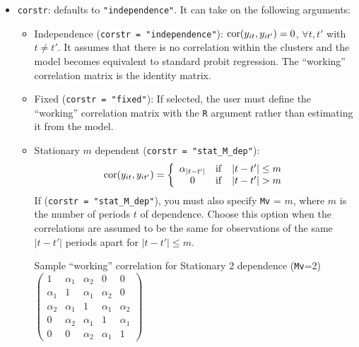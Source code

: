 \begin{itemize}
\item \texttt{corstr}: defaults to {\tt "independence"}.  It can take on the following arguments:
\begin{itemize}
\item Independence (\texttt{corstr = "independence"}): ${\rm
    cor}(y_{it}, y_{it'})=0$, $\forall t, t'$ with $t\ne t'$.  It assumes that there is no correlation within the clusters and the model becomes equivalent to standard probit regression.  The ``working'' correlation matrix is the identity matrix.
\item Fixed (\texttt{corstr = "fixed"}): If selected, the user must define the ``working'' correlation matrix with the \texttt{R} argument rather than estimating it from the model.
\item Stationary $m$ dependent (\texttt{corstr = "stat\_M\_dep"}):
  $${\rm cor}(y_{it}, y_{it'})=\left\{\begin{array}{ccc}
      \alpha_{|t-t'|} & {\rm if} & |t-t'|\le m \\ 0 & {\rm if}
      & |t-t'| > m
    \end{array}\right.$$
  If (\texttt{corstr = "stat\_M\_dep"}), you must also specify \texttt{Mv} = $m$, where $m$
is the number of periods $t$ of dependence.  Choose this option when the correlations are assumed to be the same for observations of the same $|t-t'|$ periods apart for $|t-t'| \leq m$.
\begin{center}
Sample ``working'' correlation for Stationary 2 dependence ({\tt Mv}=2)\\
\bigskip
$\left( \begin{array}{ccccc}
1 & \alpha_1 & \alpha_2 & 0 & 0 \\
\alpha_1 & 1 & \alpha_1 & \alpha_2 & 0 \\
\alpha_2 & \alpha_1 & 1 & \alpha_1 & \alpha_2 \\
0 & \alpha_2 & \alpha_1 & 1 & \alpha_1 \\
0 & 0 & \alpha_2 & \alpha_1 & 1
\end{array} \right) $
\end{center}


\end{itemize}
\end{itemize}
